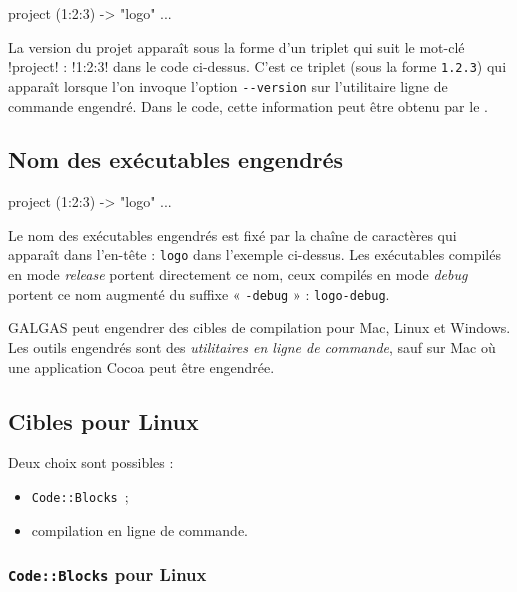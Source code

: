 
\begin{galgas}
project (1:2:3) -> "logo" {
  ...
}
\end{galgas}

La version du projet apparaît sous la forme d'un triplet qui suit le mot-clé \ggs!project! : \ggs!1:2:3! dans le code ci-dessus. C'est ce triplet (sous la forme \texttt{1.2.3}) qui apparaît lorsque l'on invoque l'option \texttt{-{}-version} sur l'utilitaire ligne de commande engendré.
Dans le code, cette information peut être obtenu par le .


\subsection{Nom des exécutables engendrés}

\begin{galgas}
project (1:2:3) -> "logo" {
  ...
}
\end{galgas}

Le nom des exécutables engendrés est fixé par la chaîne de caractères qui apparaît dans l'en-tête : \texttt{logo} dans l'exemple ci-dessus. Les exécutables compilés en mode \emph{release} portent directement ce nom, ceux compilés en mode \emph{debug} portent ce nom augmenté du suffixe « \texttt{-debug} » : \texttt{logo-debug}.



GALGAS peut engendrer des cibles de compilation pour Mac, Linux et Windows. Les outils engendrés sont des \emph{utilitaires en ligne de commande}, sauf sur Mac où une application Cocoa peut être engendrée.

\subsection{Cibles pour Linux}

Deux choix sont possibles :
\begin{itemize}
\item \texttt{Code{}::Blocks}~;
\item compilation en ligne de commande.
\end{itemize}

\subsubsection{\texttt{Code{}::Blocks} pour Linux}

